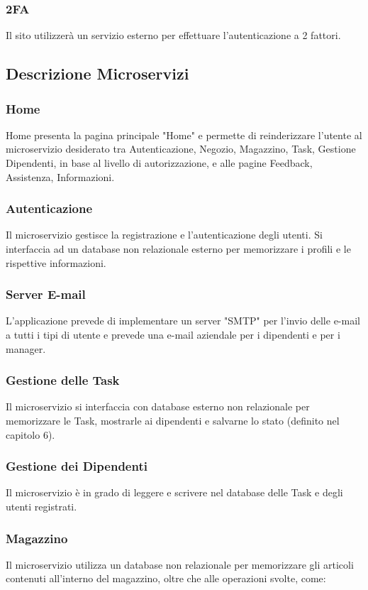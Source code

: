 \documentclass{report}
\begin{document}
\subsubsection{2FA}
Il sito utilizzerà un servizio esterno per effettuare l'autenticazione a 2 fattori.

\subsection{Descrizione Microservizi}

\subsubsection*{Home}
Home presenta la pagina principale "Home" e permette di reinderizzare l'utente al microservizio desiderato tra Autenticazione, Negozio, Magazzino, Task, Gestione Dipendenti, in base al livello di autorizzazione, e alle pagine Feedback, Assistenza, Informazioni.

\subsubsection*{Autenticazione}
Il microservizio gestisce la registrazione e l'autenticazione degli utenti. Si interfaccia ad un database non relazionale esterno per memorizzare i profili e le rispettive informazioni.

\subsubsection*{Server E-mail}
L'applicazione prevede di implementare un server "SMTP" per l’invio delle e-mail a tutti i tipi di utente e prevede una e-mail aziendale per i dipendenti e per i manager.

\subsubsection*{Gestione delle Task}
Il microservizio si interfaccia con database esterno non relazionale per memorizzare le Task, mostrarle ai dipendenti e salvarne lo stato (definito nel capitolo 6).

\subsubsection*{Gestione dei Dipendenti}
Il microservizio è in grado di leggere e scrivere nel database delle Task e degli utenti registrati.

\subsubsection*{Magazzino}
Il microservizio utilizza un database non relazionale per memorizzare gli articoli contenuti all’interno del magazzino, oltre che alle operazioni svolte, come:
\end{document}
